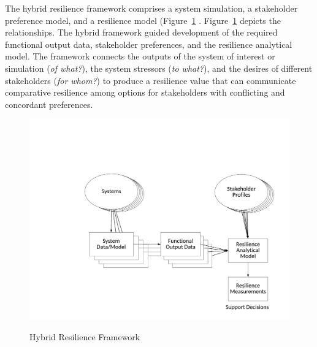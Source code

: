 \documentclass[preprint,12pt]{elsarticle}
\begin{document}
The hybrid resilience framework
comprises a system simulation, a stakeholder preference model, and a resilience
model (Figure~\ref{f:ClassIIIRes} \citet{emanuel2018,emanuel2019,Shanthikumar1983}. Figure~\ref{f:ClassIIIRes} depicts the
relationships. The hybrid framework guided
development of the required functional output data, stakeholder
preferences, and the resilience analytical model. The framework connects  the
outputs of the system of interest or simulation (\emph{of what?}), the
system stressors 
(\emph{to what?}),
and the desires of different stakeholders (\emph{for whom?}) to produce a resilience
value that can communicate comparative resilience among options for
 stakeholders with conflicting and concordant preferences.

\begin{figure}
\begin{center}
\includegraphics[width=5in]{ClassIIIRes}
\end{center}
\renewcommand{\baselinestretch}{1}
\small\normalsize
\begin{quote}
\caption{Hybrid Resilience Framework}
\label{f:ClassIIIRes}
\end{quote}
\end{figure}
\end{document}
